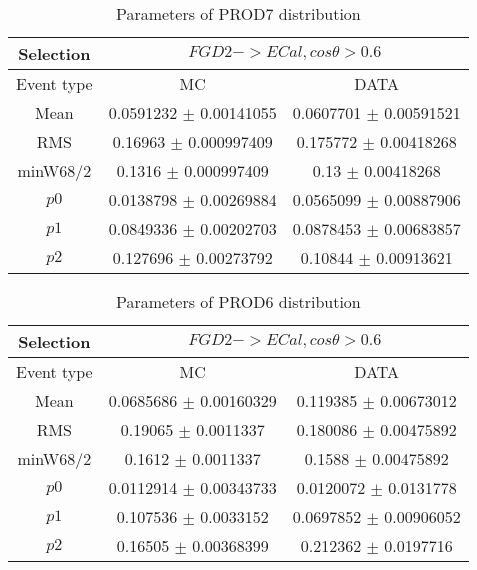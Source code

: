 \documentclass[a4paper,12pt]{article}
\begin{document}
\begin{table}[htbp]
\begin{center}
\begin{tabular}{|c|c|c|}
        \hline
        Selection & \multicolumn{2}{|c|}{$FGD2->ECal, cos\theta>0.6$}  \\ \hline
        Event type & MC & DATA \\ 
        \hline
        Mean & 0.0591232 $\pm$ 0.00141055 & 0.0607701 $\pm$ 0.00591521 \\ 
        \hline 
        RMS & 0.16963 $\pm$ 0.000997409 & 0.175772 $\pm$ 0.00418268 \\ 
        \hline 
        minW68/2 & 0.1316 $\pm$ 0.000997409 & 0.13 $\pm$ 0.00418268 \\ 
        \hline 
        $p0$ & 0.0138798 $\pm$ 0.00269884 & 0.0565099 $\pm$ 0.00887906 \\ 
        \hline 
        $p1$ & 0.0849336 $\pm$ 0.00202703 & 0.0878453 $\pm$ 0.00683857 \\ 
        \hline 
        $p2$ & 0.127696 $\pm$ 0.00273792 & 0.10844 $\pm$ 0.00913621 \\ 
        \hline 
\end{tabular}
\caption{Parameters of PROD7 distribution } \vspace{0.2in}
\label{xxx}
\end{center}
\end{table}
\begin{table}[htbp]
\begin{center}
\begin{tabular}{|c|c|c|}
        \hline
        Selection & \multicolumn{2}{|c|}{$FGD2->ECal, cos\theta>0.6$}  \\ \hline
        Event type & MC & DATA \\ 
        \hline
        Mean & 0.0685686 $\pm$ 0.00160329 & 0.119385 $\pm$ 0.00673012 \\ 
        \hline 
        RMS & 0.19065 $\pm$ 0.0011337 & 0.180086 $\pm$ 0.00475892 \\ 
        \hline 
        minW68/2 & 0.1612 $\pm$ 0.0011337 & 0.1588 $\pm$ 0.00475892 \\ 
        \hline 
        $p0$ & 0.0112914 $\pm$ 0.00343733 & 0.0120072 $\pm$ 0.0131778 \\ 
        \hline 
        $p1$ & 0.107536 $\pm$ 0.0033152 & 0.0697852 $\pm$ 0.00906052 \\ 
        \hline 
        $p2$ & 0.16505 $\pm$ 0.00368399 & 0.212362 $\pm$ 0.0197716 \\ 
        \hline 
\end{tabular}
\caption{Parameters of PROD6 distribution } \vspace{0.2in}
\label{xxx}
\end{center}
\end{table}
\end{document}
